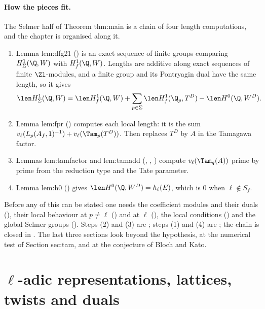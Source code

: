 \paragraph{How the pieces fit.} The Selmer half of Theorem thm:main is a chain of four length computations, and the chapter is organised along it.
\begin{enumerate}[label=(\arabic*)]
\item Lemma lem:dfg21 () is an exact sequence of finite groups comparing $H^1_\Sigma(\Q,W)$ with $H^1_f(\Q,W)$. Lengths are additive along exact
sequences of finite $\Zl$-modules, and a finite group and its Pontryagin dual have the same length, so it gives
\[
\len H^1_\Sigma(\Q,W)=\len H^1_f(\Q,W)+\sum_{p\in\Sigma}\len H^1_f(\Q_p,T^D)-\len H^0(\Q,W^D).
\]
\item Lemma lem:fpr () computes each local length: it is the sum $v_\ell(L_p(A_f,1)^{-1})+v_\ell(\Tam_p(T^D))$. Then
 replaces $T^D$ by $A$ in the Tamagawa factor.
\item Lemmas lem:tamfactor and lem:tamadd (, , ) compute $v_\ell(\Tam_q(A))$
prime by prime from the reduction type and the Tate parameter.
\item Lemma lem:h0 () gives $\len H^0(\Q,W^D)=h_\ell(E)$, which is $0$ when $\ell\notin S_f$.
\end{enumerate}
Before any of this can be stated one needs the coefficient modules and their duals (), their local behaviour at $p\ne\ell$
() and at $\ell$ (), the local conditions () and the global Selmer groups
(). Steps (2) and (3) are ; steps (1) and (4) are
; the chain is closed in . The last three sections look beyond the hypothesis, at the numerical test of
Section sec:tam, and at the conjecture of Bloch and Kato.

\section[\texorpdfstring{$\ell$}{l}-adic representations and duals]{\texorpdfstring{$\ell$}{l}-adic representations, lattices, twists and duals}\label{sec:blochkato:representations}


